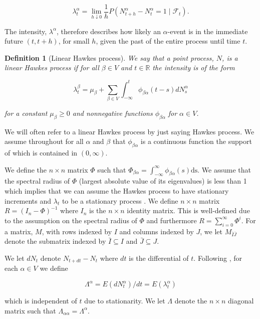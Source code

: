 \documentclass[accepted]{uai2021} %
\newtheorem{defn}[thm]{Definition}
\newcommand{\ds}{\text{ds}}
\begin{document}
$$
\lambda_t^{\alpha} = \lim_{h \downarrow 0} \dfrac{1}{h} P(N_{t + h}^\alpha  - 
N_t^\alpha = 1
\mid \mathcal{F}_t).
$$

The intensity, $\lambda^\alpha$, therefore describes how likely an 
$\alpha$-event is in the immediate future $(t, t+h)$, for small $h$, given the 
past of the entire process until time $t$.

\begin{defn}[Linear Hawkes process]
	We say that a point process, $N$, is a \emph{linear Hawkes process} if for 
	all $\beta\in V$ and $t\in \mathbb{R}$ the 
	intensity is of the form
	
	$$
	\lambda_t^\beta = \mu_\beta + \sum_{\beta \in V} \int_{-\infty}^{t} 
	\phi_{\beta\alpha}(t - s) d 
	N_s^\alpha
	$$
	
	\noindent for a constant $\mu_\beta \geq 0$ and nonnegative functions 
	$\phi_{\beta\alpha}$ for $\alpha \in V$.
	\label{def:hawProc}
\end{defn}

We will often refer to a linear Hawkes process by just saying Hawkes process. 
We assume throughout for all 
$\alpha$ and $\beta$ that $\phi_{\beta\alpha}$ is a continuous 
function the support of which is contained in $(0, \infty)$. 

We define the $n\times n$ matrix $\Phi$ such that $\Phi_{\beta\alpha} = 
\int_{-\infty}^\infty 
\phi_{\beta\alpha}(s) \ds$. We assume that the spectral radius of $\Phi$ 
(largest 
absolute value of its eigenvalues) is less than 1 which implies that we can 
assume the Hawkes process to have stationary increments and $\lambda_t$ to be a 
stationary process \citep{jovanovic2015, bacry2016}.
We define $n\times n$ matrix $R=(I_n - \Phi)^{-1}$ where $I_n$ is the 
$n\times n$ identity matrix. This is well-defined due to the assumption on 
the spectral radius of $\Phi$ and furthermore $R = \sum_{i=0}^\infty \Phi^i$. 
For a matrix, $M$, with rows indexed by $I$ and columns indexed by $J$, we let 
$M_{\bar{I}\bar{J}}$ denote the submatrix indexed by $\bar{I}\subseteq I$ and 
$\bar{J}\subseteq J$. 


We let $dN_t$ denote $N_{t+dt} - N_t$ where $dt$ is the differential of $t$. 
Following \cite{hawkesJRSSB1971}, for each $\alpha\in V$ we define

$$
\Lambda^\alpha = E(dN_t^\alpha)/dt = E(\lambda_t^\alpha)
$$

\noindent which is independent of $t$ due to stationarity. We let $\Lambda$ 
denote the $n\times n$ diagonal matrix such that $\Lambda_{\alpha\alpha} = 
\Lambda^\alpha$.
\end{document}

